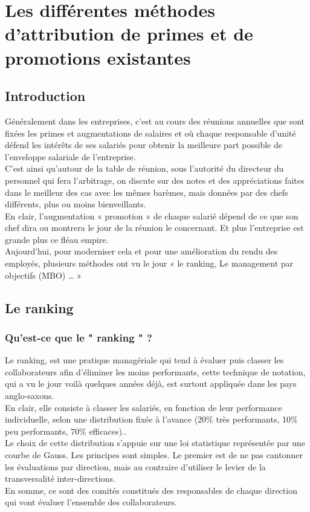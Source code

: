 \chapter{Les différentes méthodes d’attribution de primes et de  promotions existantes}


\section{Introduction}

Généralement dans les entreprises, c’est au cours des réunions annuelles que sont fixées les primes et augmentations de salaires et où chaque responsable d’unité défend les intérêts de ses salariés pour obtenir la meilleure part possible de l’enveloppe salariale de l’entreprise. \\
C’est ainsi qu’autour de la table de réunion, sous l’autorité du directeur du personnel qui fera l’arbitrage, on discute sur des notes et des appréciations faites dans le meilleur des cas avec les mêmes barèmes, mais données par des chefs différents, plus ou moins bienveillants.\\ 
En clair, l’augmentation « promotion » de chaque salarié dépend de ce que son chef dira ou montrera le jour de la réunion le concernant. Et plus l’entreprise est grande plus ce fléau empire.\\
Aujourd’hui, pour moderniser cela et pour une amélioration du rendu des employés, plusieurs méthodes ont vu le jour « le ranking, Le management par objectifs (MBO) … »
\\
\section{Le ranking}
\subsection{Qu'est-ce que le " ranking " ?}

Le ranking, est une pratique managériale qui tend à évaluer puis classer les collaborateurs afin d'éliminer les moins performants, cette technique de notation, qui a vu le jour voilà quelques années déjà, est surtout appliquée dans les pays anglo-saxons.\\ 
En clair, elle consiste à classer les salariés, en fonction de leur performance individuelle, selon une distribution fixée à l’avance (20\% très performants, 10\% peu performants, 70\% efficaces)..\\ 
Le choix de cette distribution s’appuie sur une loi statistique représentée par une courbe de Gauss. Les principes sont simples. Le premier est de ne pas cantonner les évaluations par direction, mais au contraire d’utiliser le levier de la transversalité inter-directions.\\ En somme, ce sont des comités constitués des responsables de chaque direction qui vont évaluer l’ensemble des collaborateurs.
\newpage
